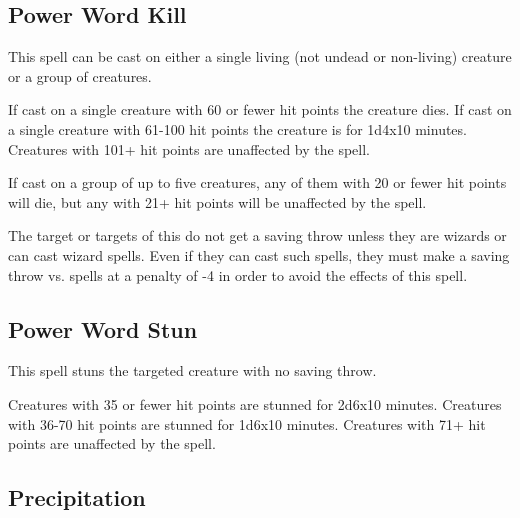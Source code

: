 \begin{multicols*}{2}
\subsection{Power Word Kill}\label{spell:Power Word Kill}

This spell can be cast on either a single living (not undead or non-living) creature or a group of creatures.

If cast on a single creature with 60 or fewer hit points the creature dies. If cast on a single creature with 61-100 hit points the creature is   for 1d4x10 minutes. Creatures with 101+ hit points are unaffected by the spell.

If cast on a group of up to five creatures, any of them with 20 or fewer hit points will die, but any with 21+ hit points will be unaffected by the spell.

The target or targets of this do not get a saving throw unless they are wizards or can cast wizard spells. Even if they can cast such spells, they must make a saving throw vs. spells at a penalty of -4 in order to avoid the effects of this spell.

\subsection{Power Word Stun}\label{spell:Power Word Stun}

This spell stuns the targeted creature with no saving throw.

Creatures with 35 or fewer hit points are stunned for 2d6x10 minutes. Creatures with 36-70 hit points are stunned for 1d6x10 minutes. Creatures with 71+ hit points are unaffected by the spell.

\subsection{Precipitation}\label{spell:Precipitation}
\end{multicols*}

